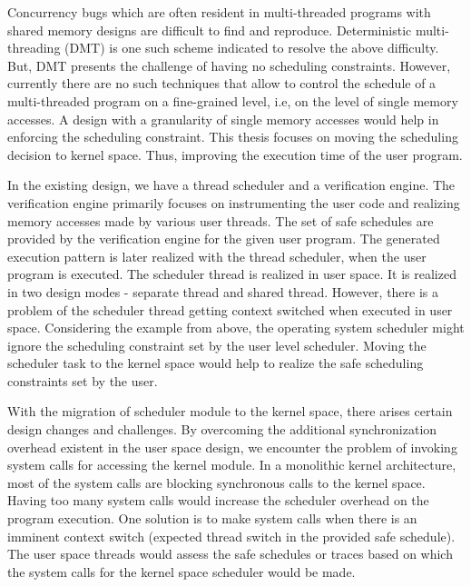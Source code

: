 Concurrency bugs which are often resident in multi-threaded programs with shared memory designs are difficult to find and reproduce. 
Deterministic multi-threading (DMT) is one such scheme indicated to resolve the above difficulty. 
But, DMT presents the challenge of having no scheduling constraints.  
However, currently there are no such techniques that allow to control the schedule of a multi-threaded program on a fine-grained level, i.e, on the level of single memory accesses. 
A design with a granularity of single memory accesses would help in enforcing the scheduling constraint. 
This thesis focuses on moving the scheduling decision to kernel space. 
Thus, improving the execution time of the user program.


In the existing design, we have a thread scheduler and a verification engine.  
The verification engine primarily focuses on instrumenting the user code and realizing memory accesses made by various user threads. 
The set of safe schedules are provided by the verification engine for the given user program. 
The generated execution pattern is later realized with the thread scheduler, when the user program is executed. 
The scheduler thread is realized in user space. 
It is realized in two design modes - separate thread and shared thread. 
However, there is a problem of the scheduler thread getting context switched when executed in user space. 
Considering the example from above, the operating system scheduler might ignore the scheduling constraint set by the user level scheduler. 
Moving the scheduler task to the kernel space would help to realize the safe scheduling constraints set by the user. 

With the migration of scheduler module to the kernel space, there arises certain design changes and challenges. 
By overcoming the additional synchronization overhead existent in the user space design, we encounter the problem of invoking system calls for accessing the kernel module. 
In a monolithic kernel architecture, most of the system calls are blocking synchronous calls to the kernel space. 
Having too many system calls would increase the scheduler overhead on the program execution. 
One solution is to make system calls when there is an imminent context switch (expected thread switch in the provided safe schedule). 
The user space threads would assess the safe schedules or traces based on which the system calls for the kernel space scheduler would be made. 


